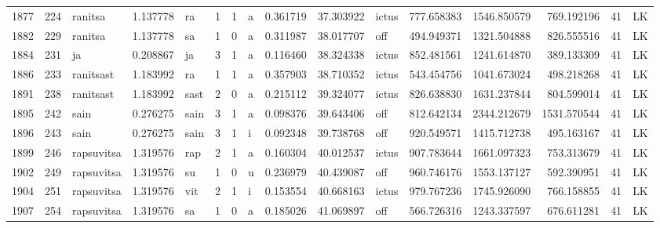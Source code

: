 \begin{tabular}{lrlrllllrrlrrrll}
1877 &         224 &          ranitsa &  1.137778 &      ra &        1 &      1 &       a &      0.361719 &     37.303922 &  ictus &   777.658383 &  1546.850579 &   769.192196 &     41 &        LK \\
1882 &         229 &          ranitsa &  1.137778 &      sa &        1 &      0 &       a &      0.311987 &     38.017707 &    off &   494.949371 &  1321.504888 &   826.555516 &     41 &        LK \\
1884 &         231 &               ja &  0.208867 &      ja &        3 &      1 &       a &      0.116460 &     38.324338 &  ictus &   852.481561 &  1241.614870 &   389.133309 &     41 &        LK \\
1886 &         233 &        ranitsast &  1.183992 &      ra &        1 &      1 &       a &      0.357903 &     38.710352 &  ictus &   543.454756 &  1041.673024 &   498.218268 &     41 &        LK \\
1891 &         238 &        ranitsast &  1.183992 &    sast &        2 &      0 &       a &      0.215112 &     39.324077 &  ictus &   826.638830 &  1631.237844 &   804.599014 &     41 &        LK \\
1895 &         242 &             sain &  0.276275 &    sain &        3 &      1 &       a &      0.098376 &     39.643406 &    off &   812.642134 &  2344.212679 &  1531.570544 &     41 &        LK \\
1896 &         243 &             sain &  0.276275 &    sain &        3 &      1 &       i &      0.092348 &     39.738768 &    off &   920.549571 &  1415.712738 &   495.163167 &     41 &        LK \\
1899 &         246 &       rapsuvitsa &  1.319576 &     rap &        2 &      1 &       a &      0.160304 &     40.012537 &  ictus &   907.783644 &  1661.097323 &   753.313679 &     41 &        LK \\
1902 &         249 &       rapsuvitsa &  1.319576 &      su &        1 &      0 &       u &      0.236979 &     40.439087 &    off &   960.746176 &  1553.137127 &   592.390951 &     41 &        LK \\
1904 &         251 &       rapsuvitsa &  1.319576 &     vit &        2 &      1 &       i &      0.153554 &     40.668163 &  ictus &   979.767236 &  1745.926090 &   766.158855 &     41 &        LK \\
1907 &         254 &       rapsuvitsa &  1.319576 &      sa &        1 &      0 &       a &      0.185026 &     41.069897 &    off &   566.726316 &  1243.337597 &   676.611281 &     41 &        LK \\

\end{tabular}
